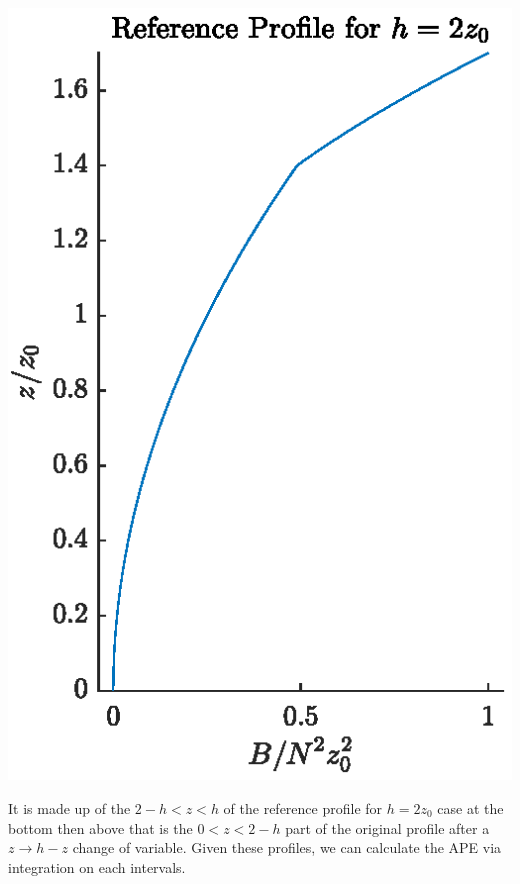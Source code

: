 \documentclass[11pt,letterpaper]{book}
\theoremstyle{definition}
\begin{document}
\begin{center}
\includegraphics[scale=1]{Fig/hll2z0}
\end{center}
It is made up of the $2-h<z<h$ of the reference profile for $h = 2z_0$ case at the bottom then above that is the $0<z<2-h$ part of the original profile after a $z\to h-z$ change of variable. Given these profiles, we can calculate the APE via integration on each intervals.


\printbibliography[heading=bibintoc,title={Reference}]
\end{document}
